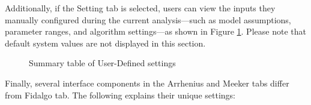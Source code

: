 \hspace*{8mm} Additionally, if the Setting tab is selected, users can view the inputs they manually configured during the current analysis—such as model assumptions, parameter ranges, and algorithm settings—as shown in Figure \ref{fig:Fidalgo-shiny2}. Please note that default system values are not displayed in this section.

\begin{figure}[H]
    \caption{Summary table of User-Defined settings}
    \label{fig:Fidalgo-shiny2}
\end{figure}

\hspace*{8mm} Finally, several interface components in the Arrhenius and Meeker tabs differ from Fidalgo tab. The following explains their unique settings:

